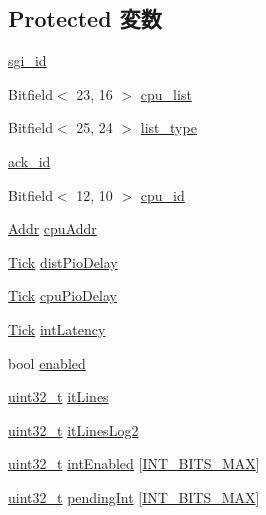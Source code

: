\subsection*{Protected 変数}
\begin{DoxyCompactItemize}
\item 
\hyperlink{classPl390_af2b76f78cc36e39f8782a67aa03afbd0}{sgi\_\-id}
\item 
Bitfield$<$ 23, 16 $>$ \hyperlink{classPl390_ae08ec5adcf38877d9f146a34871930c3}{cpu\_\-list}
\item 
Bitfield$<$ 25, 24 $>$ \hyperlink{classPl390_a6b56e232dd8fd3da34e2900f7f06039d}{list\_\-type}
\item 
\hyperlink{classPl390_ab1d4b1ab244021ea7a23b2cbcd2fbdb9}{ack\_\-id}
\item 
Bitfield$<$ 12, 10 $>$ \hyperlink{classPl390_a0fde3389d812c2863113c78e0d23108a}{cpu\_\-id}
\item 
\hyperlink{base_2types_8hh_af1bb03d6a4ee096394a6749f0a169232}{Addr} \hyperlink{classPl390_a604af0bb85a2a3f90c842febc7e8f87d}{cpuAddr}
\item 
\hyperlink{base_2types_8hh_a5c8ed81b7d238c9083e1037ba6d61643}{Tick} \hyperlink{classPl390_ab55f6a058ccebacb16d2032b086703af}{distPioDelay}
\item 
\hyperlink{base_2types_8hh_a5c8ed81b7d238c9083e1037ba6d61643}{Tick} \hyperlink{classPl390_a50352a1f6d1032a4be9c5884616a3233}{cpuPioDelay}
\item 
\hyperlink{base_2types_8hh_a5c8ed81b7d238c9083e1037ba6d61643}{Tick} \hyperlink{classPl390_a8acb46f8ecab4551225777951a774a62}{intLatency}
\item 
bool \hyperlink{classPl390_a8740ba80e30dd75e71d09fa1dcf04f3d}{enabled}
\item 
\hyperlink{Type_8hh_a435d1572bf3f880d55459d9805097f62}{uint32\_\-t} \hyperlink{classPl390_a21dc662678d340891a1d579bf78955ce}{itLines}
\item 
\hyperlink{Type_8hh_a435d1572bf3f880d55459d9805097f62}{uint32\_\-t} \hyperlink{classPl390_a6d73a4f61a4306d3aff3e9571eeccf47}{itLinesLog2}
\item 
\hyperlink{Type_8hh_a435d1572bf3f880d55459d9805097f62}{uint32\_\-t} \hyperlink{classPl390_a1bce6fc9f9b30623d11815ada1bd4f56}{intEnabled} \mbox{[}\hyperlink{classPl390_ac0434966a31be307b3b2acd8975a169b}{INT\_\-BITS\_\-MAX}\mbox{]}
\item 
\hyperlink{Type_8hh_a435d1572bf3f880d55459d9805097f62}{uint32\_\-t} \hyperlink{classPl390_a4a5f5a9735da74511b9d4e02c4ace364}{pendingInt} \mbox{[}\hyperlink{classPl390_ac0434966a31be307b3b2acd8975a169b}{INT\_\-BITS\_\-MAX}\mbox{]}

\end{DoxyCompactItemize}
